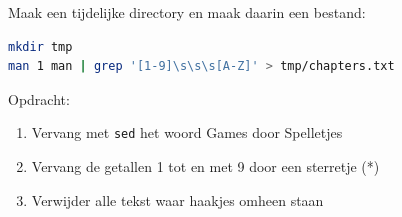 Maak een tijdelijke directory en maak daarin een bestand:
\begin{lstlisting}[language=bash]
mkdir tmp
man 1 man | grep '[1-9]\s\s\s[A-Z]' > tmp/chapters.txt
\end{lstlisting}

Opdracht:
\begin{enumerate}
\item Vervang met \texttt{sed} het woord Games door Spelletjes
\item Vervang de getallen 1 tot en met 9 door een sterretje (*)
\item Verwijder alle tekst waar haakjes omheen staan
\end{enumerate}

